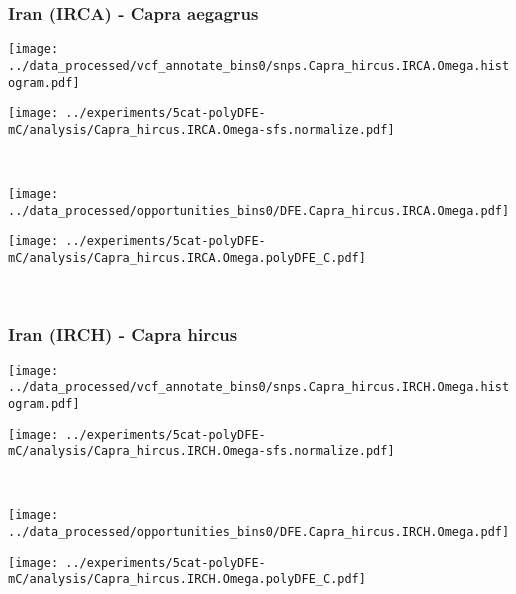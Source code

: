 \subsubsection{Iran (IRCA) - Capra aegagrus}

\begin{minipage}{0.49\linewidth}
    \texttt{[image: ../data\_processed/vcf\_annotate\_bins0/snps.Capra\_hircus.IRCA.Omega.histogram.pdf]}
\end{minipage}
\begin{minipage}{0.49\linewidth}
    \texttt{[image: ../experiments/5cat-polyDFE-mC/analysis/Capra\_hircus.IRCA.Omega-sfs.normalize.pdf]}
\end{minipage}
\\
\begin{minipage}{0.49\linewidth}
    \texttt{[image: ../data\_processed/opportunities\_bins0/DFE.Capra\_hircus.IRCA.Omega.pdf]}
\end{minipage}
\begin{minipage}{0.49\linewidth}
    \texttt{[image: ../experiments/5cat-polyDFE-mC/analysis/Capra\_hircus.IRCA.Omega.polyDFE\_C.pdf]}
\end{minipage}
\\

\subsubsection{Iran (IRCH) - Capra hircus}

\begin{minipage}{0.49\linewidth}
    \texttt{[image: ../data\_processed/vcf\_annotate\_bins0/snps.Capra\_hircus.IRCH.Omega.histogram.pdf]}
\end{minipage}
\begin{minipage}{0.49\linewidth}
    \texttt{[image: ../experiments/5cat-polyDFE-mC/analysis/Capra\_hircus.IRCH.Omega-sfs.normalize.pdf]}
\end{minipage}
\\
\begin{minipage}{0.49\linewidth}
    \texttt{[image: ../data\_processed/opportunities\_bins0/DFE.Capra\_hircus.IRCH.Omega.pdf]}
\end{minipage}
\begin{minipage}{0.49\linewidth}
    \texttt{[image: ../experiments/5cat-polyDFE-mC/analysis/Capra\_hircus.IRCH.Omega.polyDFE\_C.pdf]}
\end{minipage}
\\

